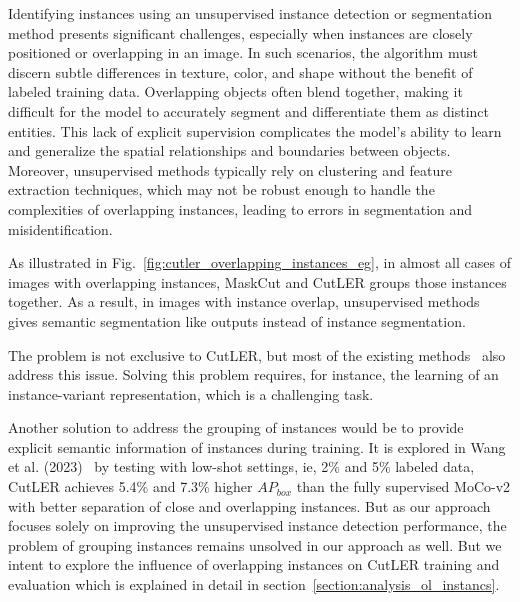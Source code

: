 Identifying instances using an unsupervised instance detection or segmentation method presents significant challenges, especially when instances are closely positioned or overlapping in an image. In such scenarios, the algorithm must discern subtle differences in texture, color, and shape without the benefit of labeled training data. Overlapping objects often blend together, making it difficult for the model to accurately segment and differentiate them as distinct entities. This lack of explicit supervision complicates the model's ability to learn and generalize the spatial relationships and boundaries between objects. Moreover, unsupervised methods typically rely on clustering and feature extraction techniques, which may not be robust enough to handle the complexities of overlapping instances, leading to errors in segmentation and misidentification.

As illustrated in Fig.~\ref{fig:cutler_overlapping_instances_eg}, in almost all cases of images with overlapping instances, MaskCut and CutLER groups those instances together. As a result, in images with instance overlap, unsupervised methods gives semantic segmentation like outputs instead of instance segmentation.

The problem is not exclusive to CutLER, but most of the existing methods~\cite{engstler2023understanding, cond1_support_2, Wang_2022_CVPR} also address this issue. Solving this problem requires, for instance, the learning of an instance-variant representation, which is a challenging task. 

Another solution to address the grouping of instances would be to provide explicit semantic information of instances during training. It is explored in Wang et al. (2023)~\cite{wang2023cut} by testing with low-shot settings, ie, 2\% and 5\% labeled data, CutLER achieves 5.4\% and 7.3\% higher \(AP_{box}\) than the fully supervised MoCo-v2 with better separation of close and overlapping instances. But as our approach focuses solely on improving the unsupervised instance detection performance, the problem of grouping instances remains unsolved in our approach as well. But we intent to explore the influence of overlapping instances on CutLER training and evaluation which is explained in detail in section~\ref{section:analysis_ol_instancs}.

